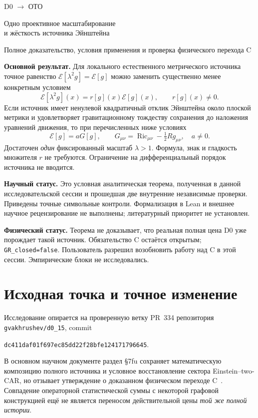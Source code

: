 \documentclass[11pt,a4paper]{article}
\newcommand{\E}{\mathcal E}
\DeclareMathOperator{\Ric}{Ric}
\begin{document}
\sloppy
{\sffamily\color{accent}\large D0 $\longrightarrow$ ОТО}
\vspace{5mm}

{\sffamily\color{ink}\LARGE Одно проективное масштабирование\\[2mm]
и жёсткость источника Эйнштейна}

\vspace{4mm}
{\large Полное доказательство, условия применения и проверка физического перехода C}
\vspace{4mm}

\textbf{Основной результат.} Для локального естественного метрического источника точное равенство
$\E[\lambda^2 g]=\E[g]$ можно заменить существенно менее конкретным условием
\[
\boxed{\E[\lambda^2g](x)=r[g](x)\E[g](x),\qquad r[g](x)\ne0.}
\]
Если источник имеет ненулевой квадратичный отклик Эйнштейна около плоской метрики и удовлетворяет гравитационному тождеству сохранения до наложения уравнений движения, то при перечисленных ниже условиях
\[
\boxed{\E[g]=aG[g],\qquad
G_{\mu\nu}=\Ric_{\mu\nu}-\tfrac12 Rg_{\mu\nu},\quad a\ne0.}
\]
Достаточен \emph{один} фиксированный масштаб $\lambda>1$. Формула, знак и гладкость множителя $r$ не требуются. Ограничение на дифференциальный порядок источника не вводится.

\textbf{Научный статус.} Это условная аналитическая теорема, полученная в данной исследовательской сессии и прошедшая две внутренние независимые проверки. Приведены точные символьные контроли. Формализация в Lean и внешнее научное рецензирование не выполнены; литературный приоритет не установлен.

\textbf{Физический статус.} Теорема не доказывает, что реальная полная цена D0 уже порождает такой источник. Обязательство C остаётся открытым; \texttt{GR\_closed=false}. Пользователь разрешил возобновить работу над C в этой сессии. Эмпирические блоки не исследовались.

\section{Исходная точка и точное изменение}
Исследование опирается на проверенную ветку PR~334 репозитория \texttt{gvakhrushev/d0\_15}, commit
\begin{center}
\texttt{dc411daf01f697ec85dd22f28bfe124171796645}.
\end{center}
В основном научном документе раздел \S7fu сохраняет математическую композицию полного источника и условное восстановление сектора Einstein--two-CAR, но отзывает утверждение о доказанном физическом переходе C~\cite{primary}. Совпадение операторной статистической суммы с некоторой графовой конструкцией ещё не является переносом действительной цены \emph{той же полной истории}.
\end{document}

